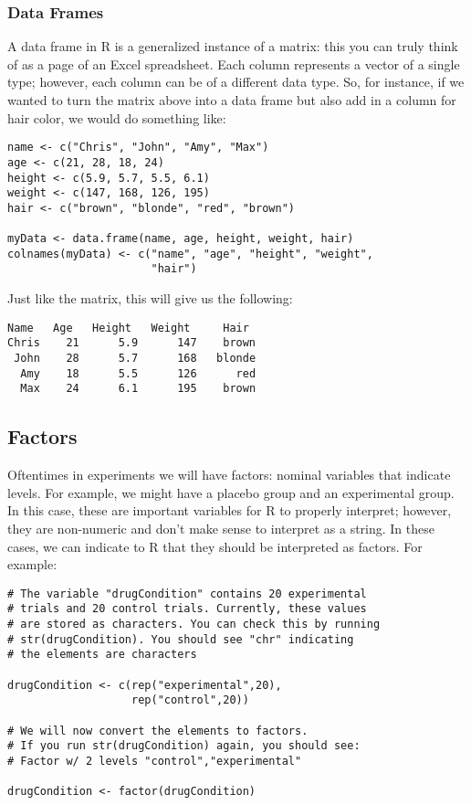 \subsubsection{Data Frames}
A data frame in R is a generalized instance of a matrix: this you can truly think of as a page of an Excel spreadsheet. Each column represents a vector of a single type; however, each column can be of a different data type. So, for instance, if we wanted to turn the matrix above into a data frame but also add in a column for hair color, we would do something like:

\begin{framed}
\begin{Verbatim}[samepage=TRUE]
name <- c("Chris", "John", "Amy", "Max")
age <- c(21, 28, 18, 24)
height <- c(5.9, 5.7, 5.5, 6.1)
weight <- c(147, 168, 126, 195)
hair <- c("brown", "blonde", "red", "brown")
 
myData <- data.frame(name, age, height, weight, hair)
colnames(myData) <- c("name", "age", "height", "weight",
                      "hair")
\end{Verbatim}
\end{framed}

Just like the matrix, this will give us the following:

\begin{framed}
\begin{Verbatim}[samepage=TRUE]
 Name   Age   Height   Weight     Hair
Chris    21      5.9      147    brown
 John    28      5.7      168   blonde
  Amy    18      5.5      126      red
  Max    24      6.1      195    brown
\end{Verbatim}
\end{framed}

\subsection{Factors}
Oftentimes in experiments we will have factors: nominal variables that indicate levels. For example, we might have a placebo group and an experimental group. In this case, these are important variables for R to properly interpret; however, they are non-numeric and don't make sense to interpret as a string. In these cases, we can indicate to R that they should be interpreted as factors. For example:

\begin{framed}
\begin{Verbatim}[samepage=TRUE]
# The variable "drugCondition" contains 20 experimental
# trials and 20 control trials. Currently, these values
# are stored as characters. You can check this by running
# str(drugCondition). You should see "chr" indicating
# the elements are characters
 
drugCondition <- c(rep("experimental",20),
                   rep("control",20))
 
# We will now convert the elements to factors.
# If you run str(drugCondition) again, you should see:
# Factor w/ 2 levels "control","experimental"
 
drugCondition <- factor(drugCondition)
\end{Verbatim}
\end{framed}

